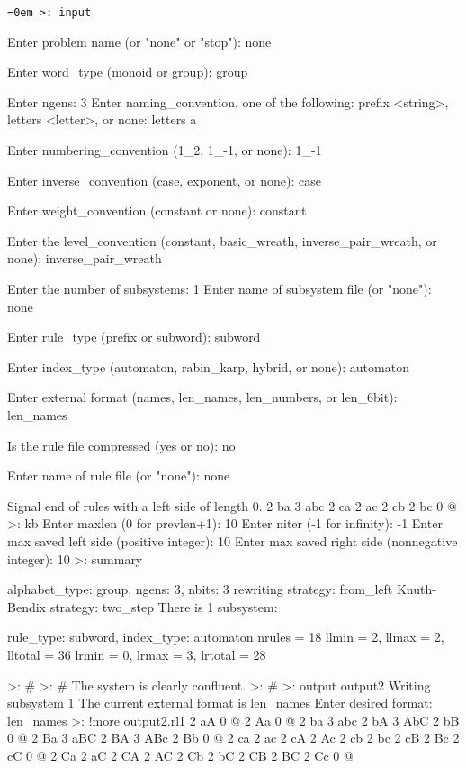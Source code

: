 \bigskip
{\tt \obeylines\obeyspaces \parindent=0em \parskip=0in \ttspace
\rightskip=-0.2in
>: input

Enter problem name (or "none" or "stop"):  none

Enter word\_type (monoid or group):  group

Enter ngens:  3
Enter naming\_convention, one of the following:
prefix <string>, letters <letter>, or none:  letters a

Enter numbering\_convention (1\_2, 1\_-1, or none):  1\_-1

Enter inverse\_convention (case, exponent, or none):  case

Enter weight\_convention (constant or none):  constant

Enter the level\_convention
(constant, basic\_wreath, inverse\_pair\_wreath, or none):  inverse\_pair\_wreath

Enter the number of subsystems:  1
Enter name of subsystem file (or "none"):  none

Enter rule\_type (prefix or subword):  subword

Enter index\_type (automaton, rabin\_karp, hybrid, or none):  automaton

Enter external format
(names, len\_names, len\_numbers, or len\_6bit):  len\_names

Is the rule file compressed (yes or no):  no

Enter name of rule file (or "none"):  none

Signal end of rules with a left side of length 0.
2 ba 3 abc
2 ca 2 ac
2 cb 2 bc
0 @ 
>: kb
Enter maxlen (0 for prevlen+1):  10
Enter niter (-1 for infinity):  -1
Enter max saved left side (positive integer):  10
Enter max saved right side (nonnegative integer):  10
>: summary

alphabet\_type:  group,  ngens:  3,   nbits:  3
rewriting strategy:  from\_left
Knuth-Bendix strategy:  two\_step
There is 1 subsystem:

rule\_type:  subword,  index\_type:  automaton
nrules = 18
llmin  = 2,  llmax = 2,  lltotal = 36
lrmin  = 0,  lrmax = 3,  lrtotal = 28

>: \#
>: \# The system is clearly confluent.
>: \#
>: output output2
Writing subsystem 1
The current external format is len\_names
Enter desired format:  len\_names
>: !more output2.rl1
2 aA 0 @
2 Aa 0 @
2 ba 3 abc
2 bA 3 AbC
2 bB 0 @
2 Ba 3 aBC
2 BA 3 ABc
2 Bb 0 @
2 ca 2 ac
2 cA 2 Ac
2 cb 2 bc
2 cB 2 Bc
2 cC 0 @
2 Ca 2 aC
2 CA 2 AC
2 Cb 2 bC
2 CB 2 BC
2 Cc 0 @
}

